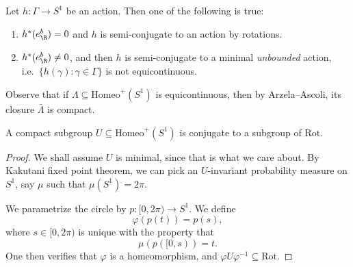 \documentclass[a4paper]{article}
\newcommand\Homeo{\mathrm{Homeo}}
\newcommand\Rot{\mathrm{Rot}}
\begin{document}
\begin{cor}
  Let $h: \Gamma \to S^1$ be an action. Then one of the following is true:
  \begin{enumerate}
    \item $h^*(e^b_\R) = 0$ and $h$ is semi-conjugate to an action by rotations.
    \item $h^*(e^b_\R) \not= 0$, and then $h$ is semi-conjugate to a minimal \emph{unbounded} action, i.e.\ $\{h(\gamma): \gamma \in \Gamma\}$ is not equicontinuous.
  \end{enumerate}
\end{cor}
Observe that if $\Lambda \subseteq \Homeo^+(S^1)$ is equicontinuous, then by Arzela--Ascoli, its closure $\bar{\Lambda}$ is compact.

\begin{lemma}
  A compact subgroup $U \subseteq \Homeo^+(S^1)$ is conjugate to a subgroup of $\Rot$.
\end{lemma}

\begin{proof}
  We shall assume $U$ is minimal, since that is what we care about. By Kakutani fixed point theorem, we can pick an $U$-invariant probability measure on $S^1$, say $\mu$ such that $\mu(S^1) = 2\pi$.

  We parametrize the circle by $p: [0, 2\pi) \to S^1$. We define
  \[
    \varphi(p(t)) = p(s),
  \]
  where $s \in [0, 2\pi)$ is unique with the property that
  \[
    \mu(p([0, s)) = t.
  \]
  One then verifies that $\varphi$ is a homeomorphism, and $\varphi U \varphi^{-1} \subseteq \Rot$.
\end{proof}
\end{document}
